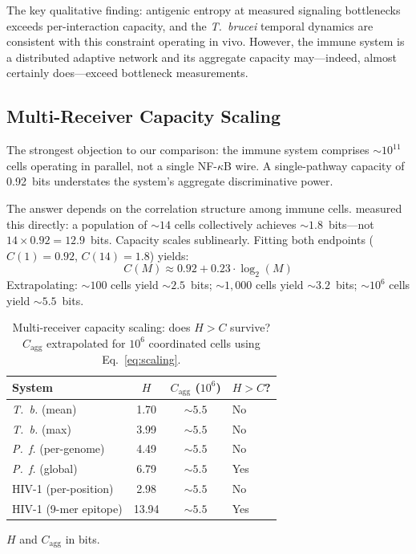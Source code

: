 \documentclass[twocolumn,10pt]{article}
\begin{document}
The key qualitative finding: antigenic entropy at measured signaling bottlenecks exceeds per-interaction capacity, and the \textit{T.~brucei} temporal dynamics are consistent with this constraint operating in vivo.  However, the immune system is a distributed adaptive network and its aggregate capacity may---indeed, almost certainly does---exceed bottleneck measurements.

\subsection{Multi-Receiver Capacity Scaling}
\label{sec:multi}

The strongest objection to our comparison: the immune system comprises ${\sim}10^{11}$ cells operating in parallel, not a single NF-$\kappa$B wire.  A single-pathway capacity of 0.92~bits understates the system's aggregate discriminative power.

The answer depends on the correlation structure among immune cells.  \citet{cheong2011} measured this directly: a population of ${\sim}14$ cells collectively achieves ${\sim}1.8$~bits---not $14 \times 0.92 = 12.9$~bits.  Capacity scales sublinearly.  Fitting both endpoints ($C(1) = 0.92$, $C(14) = 1.8$) yields:
\begin{equation}
C(M) \approx 0.92 + 0.23 \cdot \log_2(M)
\label{eq:scaling}
\end{equation}
Extrapolating: ${\sim}100$ cells yield ${\sim}2.5$~bits; ${\sim}1{,}000$ cells yield ${\sim}3.2$~bits; ${\sim}10^6$ cells yield ${\sim}5.5$~bits.

\begin{table}[t]
\centering
\caption{Multi-receiver capacity scaling: does $H > C$ survive?  $C_{\text{agg}}$ extrapolated for $10^6$ coordinated cells using Eq.~\ref{eq:scaling}.}
\label{tab:multi}
\footnotesize
\begin{tabular}{@{}lccl@{}}
\toprule
System & $H$ & $C_{\text{agg}}$ ($10^6$) & $H\!>\!C$? \\
\midrule
\textit{T.~b.} (mean) & 1.70 & ${\sim}5.5$ & No \\
\textit{T.~b.} (max) & 3.99 & ${\sim}5.5$ & No \\
\textit{P.~f.} (per-genome) & 4.49 & ${\sim}5.5$ & No \\
\textit{P.~f.} (global) & 6.79 & ${\sim}5.5$ & Yes \\
HIV-1 (per-position) & 2.98 & ${\sim}5.5$ & No \\
HIV-1 (9-mer epitope) & 13.94 & ${\sim}5.5$ & Yes \\
\bottomrule
\end{tabular}
\smallskip

\footnotesize{$H$ and $C_{\text{agg}}$ in bits.}
\end{table}
\end{document}
